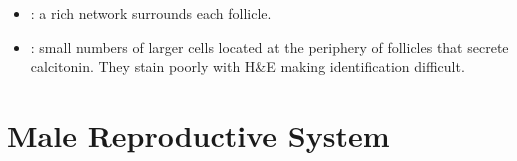 \begin{multicols}{2}
\begin{itemize}
  
  \begin{center}
  \end{center}
  
  \item {}: a rich network surrounds each follicle.
  
  \begin{center}
  \end{center}
  
  \item {}: small numbers of larger cells located at the periphery of follicles that secrete calcitonin. They stain poorly with H\&E making identification difficult.
  
  \begin{center}
  \end{center}
  
\end{itemize}
\end{multicols}

\newpage

\section{Male Reproductive System}

